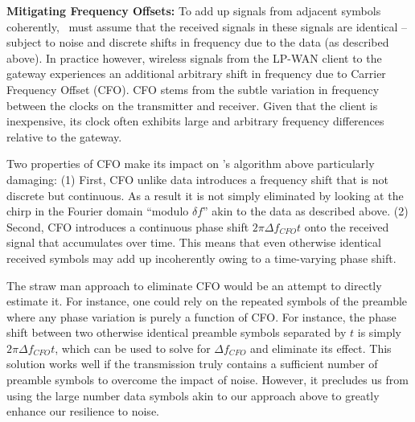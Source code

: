 \noindent \textbf{Mitigating Frequency Offsets: } To add up signals from adjacent symbols coherently, \name\ must assume that the received signals in these signals are identical -- subject to noise and discrete shifts in frequency due to the data (as described above). In practice however, wireless signals from the LP-WAN client to the gateway experiences an additional arbitrary shift in frequency due to Carrier Frequency Offset (CFO). CFO stems from the subtle variation in frequency between the clocks on the transmitter and receiver. Given that the client is inexpensive, its clock often exhibits large and arbitrary frequency differences relative to the gateway. 

Two properties of CFO make its impact on \name's algorithm above particularly damaging: (1) First, CFO unlike data introduces a frequency shift that is not discrete but continuous. As a result it is not simply eliminated by looking at the chirp in the Fourier domain ``modulo $\delta f$''  akin to the data as described above. (2) Second, CFO introduces a continuous phase shift $2 \pi \Delta f_{CFO} t$ onto the received signal that accumulates over time. This means that even otherwise identical received symbols may add up incoherently owing to a time-varying phase shift. 

The straw man approach to eliminate CFO would be an attempt to directly estimate it. For instance, one could rely on the repeated symbols of the preamble where any phase variation is purely a function of CFO. For instance, the phase shift between two otherwise identical preamble symbols separated by $t$ is simply $2 \pi \Delta f_{CFO} t$, which can be used to solve for $\Delta f_{CFO}$ and eliminate its effect. This solution works well if the transmission truly contains a sufficient number of preamble symbols to overcome the impact of noise. However, it precludes us from using the large number data symbols akin to our approach above to greatly enhance our resilience to noise. 

